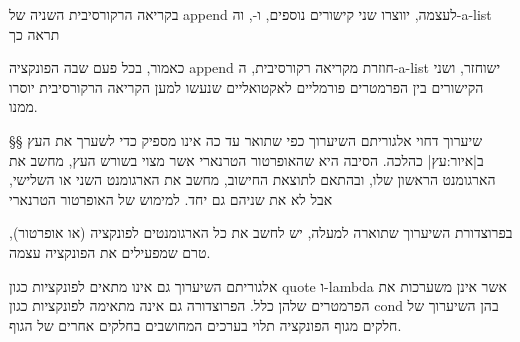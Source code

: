 בקריאה הרקורסיבית השניה של append לעצמה, יווצרו שני קישורים נוספים,
 ו-, וה-a-list תראה כך
\begin{LTR}
  \usetikzlibrary{chains,arrows}
\end{LTR}
כאמור, בכל פעם שבה הפונקציה append חוזרת מקריאה רקורסיבית, ה-a-list ישוחזר,
ושני הקישורים בין הפרמטרים פורמליים לאקטואליים שנעשו למען הקריאה הרקורסיבית
יוסרו ממנו.

§§ שיערוך דחוי
אלגוריתם השיערוך כפי שתואר עד כה אינו מספיק כדי לשערך את העץ ב|איור:עץ|
כהלכה. הסיבה היא שהאופרטור הטרנארי  אשר מצוי בשורש העץ, מחשב את
הארגומנט
הראשון שלו, ובהתאם לתוצאת החישוב, מחשב את הארגומנט השני או השלישי, אבל לא את
שניהם גם יחד. למימוש של האופרטור הטרנארי

בפרוצדורת השיערוך שתוארה למעלה, יש לחשב את כל הארגומנטים לפונקציה
(או אופרטור), טרם שמפעילים את הפונקציה עצמה.

אלגוריתם השיערוך גם אינו מתאים לפונקציות כגון quote ו-lambda אשר אינן משערכות
את הפרמטרים שלהן כלל. הפרוצדורה גם אינה מתאימה לפונקציות כגון cond בהן השיערוך
של חלקים מגוף הפונקציה תלוי בערכים המחושבים בחלקים אחרים של הגוף.

